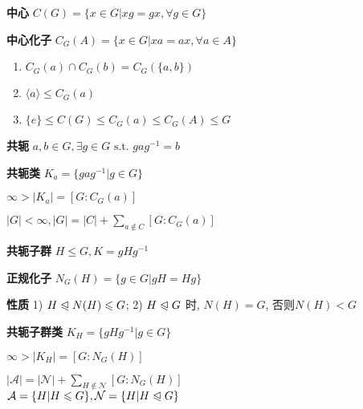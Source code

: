 \documentclass[b4paper, 10pt]{ctexart}
\newcommand*{\st}{\text{ s.t. }}
\renewcommand*{\leq}{\leqslant}
\newcommand*{\nmsubgroupeq}{\trianglelefteqslant}
\newcommand*{\gengroup}[1]{\langle #1 \rangle}
\begin{document}
\begin{multicols}{3}
    \textbf{中心} $C(G) = \{ x \in G | xg = gx, \forall g \in G\}$

    \textbf{中心化子} $C_G(A) \! = \! \{x \!\in\! G | xa \! = \! ax, \forall a \!\in\! A\}$

    \begin{theorem}[中心化子性质]
        \hfil

        \begin{enumerate}
            \item $C_G(a) \cap C_G(b) = C_G(\{a, b\})$
            \item $\gengroup{a} \leq C_G(a)$
            \item $\{e\} \!\leq\! C(G) \!\leq\! C_G(a) \!\leq\! C_G(A) \!\leq\! G$
        \end{enumerate}
    \end{theorem}

    \textbf{共轭} $a, b \in G, \exists g \in G \st gag^{-1}=b$

    \textbf{共轭类} $K_a = \{ gag^{-1} | g \in G \}$

    \begin{theorem}[共轭子群基数定理]
        $\infty > |K_a| = [G:C_G(a)]$
    \end{theorem}

    \begin{theorem}[类方程]
        $|G| \! < \! \infty, |G| \! = \! |C| + \sum\limits_{a \notin C} [G:C_G(a)]$
    \end{theorem}

    \textbf{共轭子群} $H \leq G, K = gHg^{-1}$

    \textbf{正规化子} $N_G(H) = \{g \in G | gH = Hg\}$

    \textbf{性质} 1) $H \nmsubgroupeq N(H) \leq G$; 2) $H \nmsubgroupeq G$ 时, $N(H)=G$, 否则$N(H)<G$

    \textbf{共轭子群类} $K_H = \{gHg^{-1} | g \in G\}$

    \begin{theorem}[共轭子群类基数定理]
        $\infty > |K_H| \!\! = \!\! [G:N_G(H)]$
    \end{theorem}

    \begin{theorem}[类方程2]
        $|\mathcal{A}| = |\mathcal{N}| + \sum\limits_{H \notin \mathcal{N}} [G:N_G(H)]$ \\
        $\mathcal{A} = \{ H | H \leq G \}, \mathcal{N} = \{ H | H \nmsubgroupeq G \}$
    \end{theorem}


\end{multicols}
\end{document}
